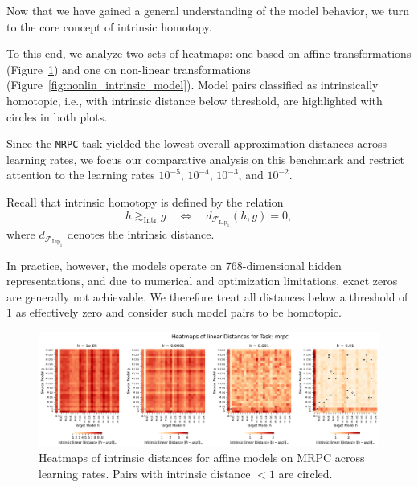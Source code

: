

Now that we have gained a general understanding of the model behavior, we turn to the core concept of intrinsic homotopy.

To this end, we analyze two sets of heatmaps: one based on affine transformations (Figure~\ref{fig:lin_intrinsic_model}) and one on non-linear transformations (Figure~\ref{fig:nonlin_intrinsic_model}).  
Model pairs classified as intrinsically homotopic, i.e., with intrinsic distance below threshold, are highlighted with circles in both plots.

Since the \texttt{MRPC} task yielded the lowest overall approximation distances across learning rates, we focus our comparative analysis on this benchmark and restrict attention to the learning rates \(10^{-5}\), \(10^{-4}\), \(10^{-3}\), and \(10^{-2}\).

Recall that intrinsic homotopy is defined by the relation
\[
h \gtrsim_\mathrm{Intr} g \quad \Leftrightarrow \quad d_{\mathcal{F}_{\mathrm{Lip}_1}}(h, g) = 0,
\]
where \( d_{\mathcal{F}_{\mathrm{Lip}_1}} \) denotes the intrinsic distance.

In practice, however, the models operate on 768-dimensional hidden representations, and due to numerical and optimization limitations, exact zeros are generally not achievable.  
We therefore treat all distances below a threshold of \(1\) as effectively zero and consider such model pairs to be homotopic.

\begin{figure}[H]
	\centering
	\includegraphics[width=\linewidth]{Abschlussarbeit/Pictures/heatmaps_smaller_circles/Heatmap_linear_distance_all_lrs_mrpc_homotopy.png}
	\caption{Heatmaps of intrinsic distances for affine models on MRPC across learning rates. Pairs with intrinsic distance $<1$ are circled.}
	\label{fig:lin_intrinsic_model}
\end{figure}

